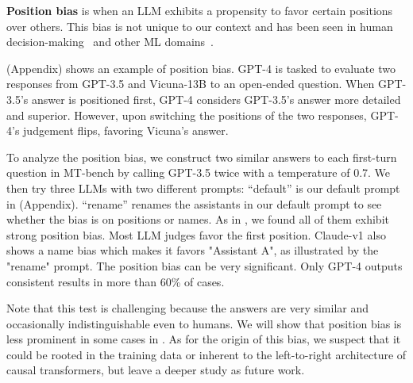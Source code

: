 \textbf{Position bias} is when an LLM exhibits a propensity to favor certain positions over others. This bias is not unique to our context and has been seen in human decision-making~\cite {blunch1984position, raghubir2006center} and other ML domains~\cite{ko2020look, wang2018position}. 

 (Appendix) shows an example of position bias. 
GPT-4 is tasked to evaluate two responses from GPT-3.5 and Vicuna-13B to an open-ended question. When GPT-3.5's answer is positioned first, GPT-4 considers GPT-3.5's answer more detailed and superior. However, upon switching the positions of the two responses, GPT-4's judgement flips, favoring Vicuna's answer.

To analyze the position bias, we construct two similar answers to each first-turn question in MT-bench by calling GPT-3.5 twice with a temperature of 0.7.
We then try three LLMs with two different prompts:
``default'' is our default prompt in  (Appendix).
``rename'' renames the assistants in our default prompt to see whether the bias is on positions or names.
As in , we found all of them exhibit strong position bias. Most LLM judges favor the first position. Claude-v1 also shows a name bias which makes it favors "Assistant A", as illustrated by the "rename" prompt. The position bias can be very significant. Only GPT-4 outputs consistent results in more than 60\% of cases.

Note that this test is challenging because the answers are very similar and occasionally indistinguishable even to humans. We will show that position bias is less prominent in some cases in .
As for the origin of this bias, we suspect that it could be rooted in the training data or inherent to the left-to-right architecture of causal transformers, but leave a deeper study as future work.


